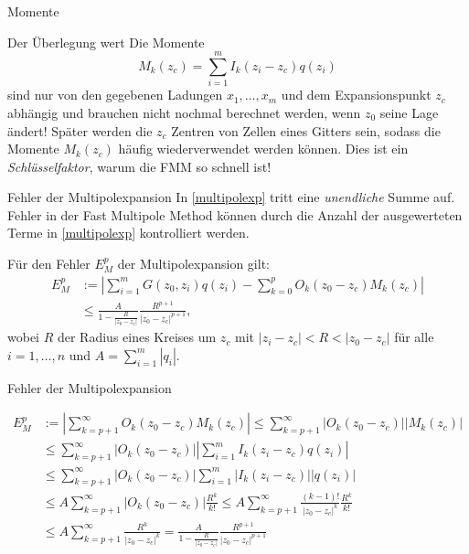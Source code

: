 \documentclass[ngerman]{beamer}
\begin{document}
\begin{frame}{Momente}
\begin{block}{Der Überlegung wert}
Die Momente \[ M_k(z_c) =  \sum_{i=1}^m I_k(z_i-z_c) q(z_i) \] sind nur von den gegebenen Ladungen $x_1,\ldots,x_m$ und dem Expansionspunkt $z_c$ abhängig und brauchen nicht nochmal berechnet werden, wenn $z_0$ seine Lage ändert!
Später werden die $z_c$ Zentren von Zellen eines Gitters sein, sodass die Momente $M_k(z_c)$ häufig wiederverwendet werden können. Dies ist ein \emph{Schlüsselfaktor}, warum die FMM so schnell ist!
\end{block}

\end{frame}
\begin{frame}{Fehler der Multipolexpansion}
In \eqref{multipolexp} tritt eine \emph{unendliche} Summe auf. Fehler in der Fast Multipole Method können durch die Anzahl der ausgewerteten Terme in \eqref{multipolexp} kontrolliert werden.
\begin{Satz}
Für den Fehler $E_M^p$ der Multipolexpansion gilt:
\begin{align*}
E^p_M&:= \left|\sum_{i=1}^m {G(z_0,z_i)q(z_i)} - \sum_{k=0}^p O_k(z_0-z_c)M_k(z_c)\right| \\
&\leq \frac{A}{1-\frac{R}{|z_0-z_c|}}\frac{R^{p+1}}{|z_0-z_c|^{p+1}}, 
\end{align*}
wobei $R$ der Radius eines Kreises um $z_c$ mit $|z_i-z_c| < R < |z_0-z_c|$ für alle $i=1,\ldots,n$ und $A=\sum_{i=1}^m |q_i|$.
\end{Satz}
\end{frame}

\begin{frame}{Fehler der Multipolexpansion}
\footnotesize
\begin{Beweis}
\begin{align*}
E^p_M&:= \left|\sum_{k=p+1}^\infty O_k(z_0-z_c)M_k(z_c)\right| \leq \sum_{k=p+1}^\infty |O_k(z_0-z_c)||M_k(z_c)| \\
&\leq \sum_{k=p+1}^\infty |O_k(z_0-z_c)| \left|\sum_{i=1}^m I_k(z_i-z_c) q(z_i)\right| \\
&\leq \sum_{k=p+1}^\infty |O_k(z_0-z_c)| \sum_{i=1}^m |I_k(z_i-z_c)| |q(z_i)| \\
&\leq A \sum_{k=p+1}^\infty |O_k(z_0-z_c)| \frac{R^k}{k!} \leq A \sum_{k=p+1}^\infty \frac{(k-1)!}{|z_0-z_c|^k} \frac{R^k}{k!} \\
&\leq A \sum_{k=p+1}^\infty \frac{R^k}{|z_0-z_c|^k} = \frac{A}{1-\frac{R}{|z_0-z_c|}}\frac{R^{p+1}}{|z_0-z_c|^{p+1}}
\end{align*}
\end{Beweis}
\end{frame}
\end{document}
